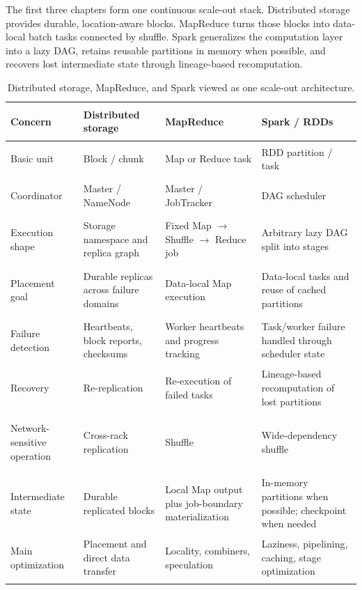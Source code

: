 \documentclass[11pt,a4paper,oneside]{book}
\begin{document}
The first three chapters form one continuous scale-out stack. Distributed storage provides durable, location-aware blocks. MapReduce turns those blocks into data-local batch tasks connected by shuffle. Spark generalizes the computation layer into a lazy DAG, retains reusable partitions in memory when possible, and recovers lost intermediate state through lineage-based recomputation.

\begin{table}[htbp]
\centering
\small
\caption{Distributed storage, MapReduce, and Spark viewed as one scale-out architecture.}
\begin{tabularx}{\textwidth}{>{\bfseries\raggedright\arraybackslash}p{2.55cm} Y Y Y}
\toprule
{}
Concern & Distributed storage & MapReduce & Spark / RDDs \\
\midrule
Basic unit & Block / chunk & Map or Reduce task & RDD partition / task \\
Coordinator & Master / NameNode & Master / JobTracker & DAG scheduler \\
Execution shape & Storage namespace and replica graph & Fixed Map $\rightarrow$ Shuffle $\rightarrow$ Reduce job & Arbitrary lazy DAG split into stages \\
Placement goal & Durable replicas across failure domains & Data-local Map execution & Data-local tasks and reuse of cached partitions \\
Failure detection & Heartbeats, block reports, checksums & Worker heartbeats and progress tracking & Task/worker failure handled through scheduler state \\
Recovery & Re-replication & Re-execution of failed tasks & Lineage-based recomputation of lost partitions \\
Network-sensitive operation & Cross-rack replication & Shuffle & Wide-dependency shuffle \\
Intermediate state & Durable replicated blocks & Local Map output plus job-boundary materialization & In-memory partitions when possible; checkpoint when needed \\
Main optimization & Placement and direct data transfer & Locality, combiners, speculation & Laziness, pipelining, caching, stage optimization \\
\bottomrule
\end{tabularx}
\end{table}
\end{document}
